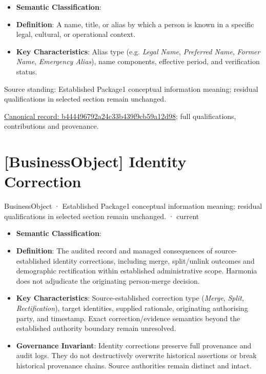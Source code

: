 \begin{itemize}


\item \textbf{Semantic Classification}: \texttt{}

\item \textbf{Definition}: A name, title, or alias by which a person is known in a specific legal, cultural, or operational context.

\item \textbf{Key Characteristics}: Alias type (e.g. \emph{Legal Name}, \emph{Preferred Name}, \emph{Former Name}, \emph{Emergency Alias}), name components, effective period, and verification status.

\end{itemize}


Source standing: Established Package1 conceptual information meaning; residual qualifications in selected section remain unchanged.


{\footnotesize \href{../../../../continuum/business/business-object/b444496792a24c33b439f9cb59a12d98.md}{Canonical record: b444496792a24c33b439f9cb59a12d98}; full qualifications, contributions and provenance.}\par
\section{[BusinessObject] Identity Correction}

\label{element:7c74034576cf4972bbb6e86e0f0e1e58}
{\small BusinessObject · Established Package1 conceptual information meaning; residual qualifications in selected section remain unchanged. · current}\par

\begin{itemize}


\item \textbf{Semantic Classification}: \texttt{}

\item \textbf{Definition}: The audited record and managed consequences of source-established identity corrections, including merge, split/unlink outcomes and demographic rectification within established administrative scope. Harmonia does not adjudicate the originating person-merge decision.

\item \textbf{Key Characteristics}: Source-established correction type (\emph{Merge}, \emph{Split}, \emph{Rectification}), target identities, supplied rationale, originating authorising party, and timestamp. Exact correction/evidence semantics beyond the established authority boundary remain unresolved.

\item \textbf{Governance Invariant}: Identity corrections preserve full provenance and audit logs. They do not destructively overwrite historical assertions or break historical provenance chains. Source authorities remain distinct and intact.

\end{itemize}


